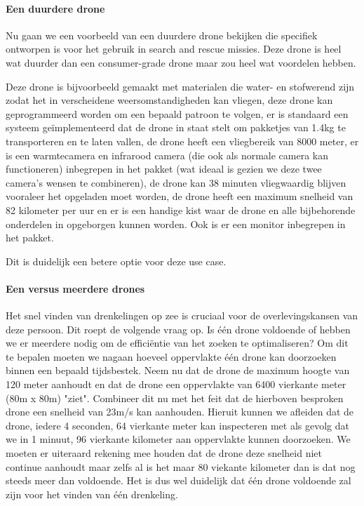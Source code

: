 \paragraph{Een duurdere drone}

Nu gaan we een voorbeeld van een duurdere drone bekijken die specifiek ontworpen is voor het gebruik in search and rescue missies. Deze drone is heel wat duurder dan een consumer-grade drone maar zou heel wat voordelen hebben. \autocite{Industrial}

Deze drone is bijvoorbeeld gemaakt met materialen die water- en stofwerend zijn zodat het in verscheidene weersomstandigheden kan vliegen, deze drone kan geprogrammeerd worden om een bepaald patroon te volgen, er is standaard een systeem geïmplementeerd dat de drone in staat stelt om pakketjes van 1.4kg te transporteren en te laten vallen, de drone heeft een vliegbereik van 8000 meter, er is een warmtecamera en infrarood camera (die ook als normale camera kan functioneren) inbegrepen in het pakket (wat ideaal is gezien we deze twee camera's wensen te combineren), de drone kan 38 minuten vliegwaardig blijven vooraleer het opgeladen moet worden, de drone heeft een maximum snelheid van 82 kilometer per uur en er is een handige kist waar de drone en alle bijbehorende onderdelen in opgeborgen kunnen worden. Ook is er een monitor inbegrepen in het pakket.

Dit is duidelijk een betere optie voor deze use case.

\paragraph{Een versus meerdere drones}

Het snel vinden van drenkelingen op zee is cruciaal voor de overlevingskansen van deze persoon. Dit roept de volgende vraag op. Is één drone voldoende of hebben we er meerdere nodig om de efficiëntie van het zoeken te optimaliseren? Om dit te bepalen moeten we nagaan hoeveel oppervlakte één drone kan doorzoeken binnen een bepaald tijdsbestek. Neem nu dat de drone de maximum hoogte van 120 meter aanhoudt en dat de drone een oppervlakte van 6400 vierkante meter (80m x 80m) "ziet". Combineer dit nu met het feit dat de hierboven besproken drone een snelheid van 23m/s kan aanhouden. Hieruit kunnen we afleiden dat de drone, iedere 4 seconden, 64 vierkante meter kan inspecteren met als gevolg dat we in 1 minuut, 96 vierkante kilometer aan oppervlakte kunnen doorzoeken. We moeten er uiteraard rekening mee houden dat de drone deze snelheid niet continue aanhoudt maar zelfs al is het maar 80 viekante kilometer dan is dat nog steeds meer dan voldoende. Het is dus wel duidelijk dat één drone voldoende zal zijn voor het vinden van één drenkeling.

